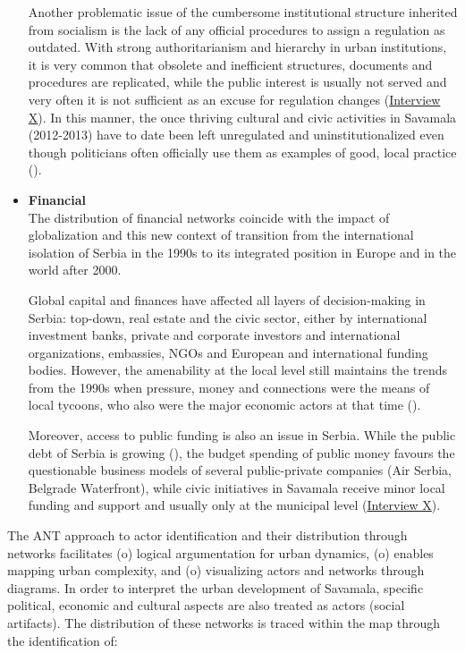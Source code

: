 \documentclass[11pt]{report}
\begin{document}
\begin{itemize}
Another problematic issue of the cumbersome institutional structure inherited from socialism is the lack of any official procedures to assign a regulation as outdated.
With strong authoritarianism and hierarchy in urban institutions, it is very common that obsolete and inefficient structures, documents and procedures are replicated, while the public interest is usually not served and very often it is not sufficient as an excuse for regulation changes  (\href{InterviewX}{Interview X}).
In this manner, the once thriving cultural and civic activities in Savamala (2012-2013) have to date been left unregulated and uninstitutionalized %
even though politicians often officially use them as examples of good, local practice (\href{N1}{\citealt{n1_princ_2016}}).
\\

\item \textbf{Financial}
\\
The distribution of financial networks coincide with the impact of globalization and this new context of transition from the international isolation of Serbia in the 1990s to its integrated position in Europe and in the world after 2000.

Global capital and finances have affected all layers of decision-making in Serbia: top-down, real estate and the civic sector, either by international investment banks, private and corporate investors and international organizations, embassies, NGOs and European and international funding bodies.
However, the amenability at the local level still maintains the trends from the 1990s when pressure, money and connections were the means of local tycoons, who also were the major economic actors at that time (\href{ETHZ}{\citealt{eth_studio_basel_belgrade._2012}}).

Moreover, access to public funding is also an issue in Serbia.
While the public debt of Serbia is growing (\href{MF}{\citealt{ministarstvo_finansija_republike_srbije_javni_2016}}),
the budget spending of public money favours the questionable business models of several public-private companies (Air Serbia, Belgrade Waterfront), while civic initiatives in Savamala receive minor local funding and support and usually only at the municipal level (\href{InterviewX}{Interview X}).
\end{itemize}

The ANT approach to actor identification and their distribution through networks facilitates
(o) logical argumentation for urban dynamics,
(o) enables mapping urban complexity, and
(o) visualizing actors and networks through diagrams.
In order to interpret the urban development of Savamala, specific political, economic and cultural aspects are also treated as actors (social artifacts).
The distribution of these networks is traced within the map through the identification of:
\end{document}
